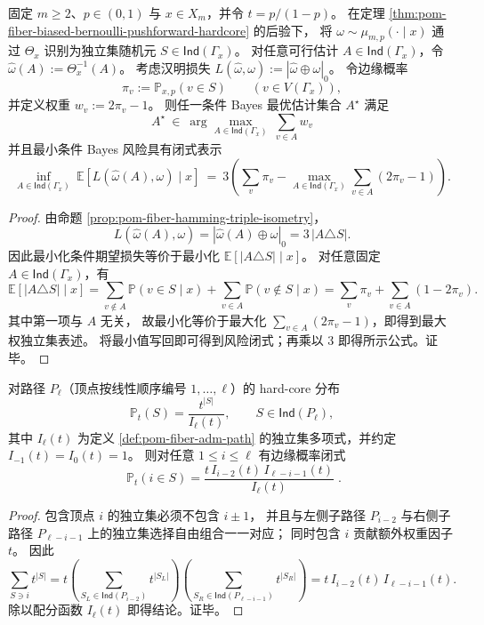 \begin{theorem}\label{thm:pom-fiber-posterior-bayes-mwis}
固定 \(m\ge 2\)、\(p\in(0,1)\) 与 \(x\in X_m\)，并令 \(t=p/(1-p)\)。
在定理 \ref{thm:pom-fiber-biased-bernoulli-pushforward-hardcore} 的后验下，
将 \(\omega\sim\mu_{m,p}(\cdot\mid x)\) 通过 \(\Theta_x\) 识别为独立集随机元 \(S\in \mathsf{Ind}(\Gamma_x)\)。
对任意可行估计 \(A\in\mathsf{Ind}(\Gamma_x)\)，令 \(\widehat\omega(A):=\Theta_x^{-1}(A)\)。
考虑汉明损失
\(
L(\widehat\omega,\omega):=|\widehat\omega\oplus\omega|_0
\)。
令边缘概率
\[
\pi_v:=\mathbb P_{x,p}(v\in S)\qquad(v\in V(\Gamma_x)),
\]
并定义权重
\(
w_v:=2\pi_v-1
\)。
则任一条件 Bayes 最优估计集合 \(A^\star\) 满足
\[
\boxed{\;
A^\star\ \in\ \arg\max_{A\in\mathsf{Ind}(\Gamma_x)}\ \sum_{v\in A} w_v\;}
\]
并且最小条件 Bayes 风险具有闭式表示
\[
\boxed{\;
\inf_{A\in\mathsf{Ind}(\Gamma_x)}\ \mathbb E\!\left[L(\widehat\omega(A),\omega)\mid x\right]
\ =\ 3\left(\sum_{v}\pi_v-\max_{A\in\mathsf{Ind}(\Gamma_x)}\sum_{v\in A}(2\pi_v-1)\right).\;}
\]
\end{theorem}
\begin{proof}
由命题 \ref{prop:pom-fiber-hamming-triple-isometry}，
\[
L(\widehat\omega(A),\omega)
=|\widehat\omega(A)\oplus\omega|_0
=3\,|A\triangle S|.
\]
因此最小化条件期望损失等价于最小化 \(\mathbb E[|A\triangle S|\mid x]\)。
对任意固定 \(A\in\mathsf{Ind}(\Gamma_x)\)，有
\[
\mathbb E[|A\triangle S|\mid x]
=\sum_{v\notin A}\mathbb P(v\in S\mid x)+\sum_{v\in A}\mathbb P(v\notin S\mid x)
=\sum_v \pi_v+\sum_{v\in A}(1-2\pi_v).
\]
其中第一项与 \(A\) 无关，
故最小化等价于最大化 \(\sum_{v\in A}(2\pi_v-1)\)，即得到最大权独立集表述。
将最小值写回即可得到风险闭式；再乘以 \(3\) 即得所示公式。证毕。
\end{proof}

\begin{proposition}\label{prop:pom-hardcore-path-marginal-closed-form}
对路径 \(P_\ell\)（顶点按线性顺序编号 \(1,\dots,\ell\)）的 hard-core 分布
\[
\mathbb P_t(S)=\frac{t^{|S|}}{I_\ell(t)},\qquad S\in \mathsf{Ind}(P_\ell),
\]
其中 \(I_\ell(t)\) 为定义 \ref{def:pom-fiber-adm-path} 的独立集多项式，并约定 \(I_{-1}(t)=I_0(t)=1\)。
则对任意 \(1\le i\le \ell\) 有边缘概率闭式
\[
\boxed{\;
\mathbb P_t(i\in S)
=\frac{t\,I_{i-2}(t)\,I_{\ell-i-1}(t)}{I_\ell(t)}\; }.
\]
\end{proposition}
\begin{proof}
包含顶点 \(i\) 的独立集必须不包含 \(i\pm 1\)，
并且与左侧子路径 \(P_{i-2}\) 与右侧子路径 \(P_{\ell-i-1}\) 上的独立集选择自由组合一一对应；
同时包含 \(i\) 贡献额外权重因子 \(t\)。
因此
\[
\sum_{S\ni i} t^{|S|}
=t\left(\sum_{S_L\in\mathsf{Ind}(P_{i-2})}t^{|S_L|}\right)\left(\sum_{S_R\in\mathsf{Ind}(P_{\ell-i-1})}t^{|S_R|}\right)
=t\,I_{i-2}(t)\,I_{\ell-i-1}(t).
\]
除以配分函数 \(I_\ell(t)\) 即得结论。证毕。
\end{proof}

